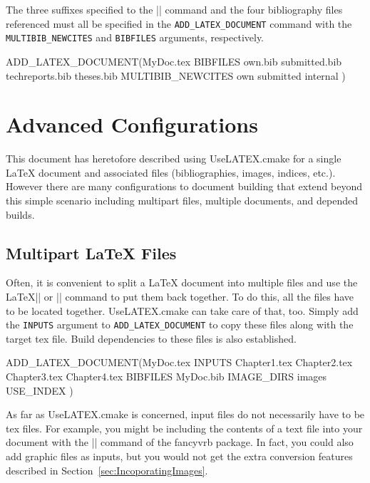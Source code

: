 \documentclass{article}
\newcommand*{\textfile}[1]{\textsf{#1}}
\newcommand*{\textlatexpackage}[1]{\textsf{#1}}
\newcommand*{\textcmake}[1]{\texttt{#1}}
\newcommand*{\UseLATEX}{\textfile{UseLATEX.cmake}\xspace}
\newcommand*{\latex}{\LaTeX\xspace}
\newcommand*{\ald}{\textcmake{ADD\_LATEX\_DOCUMENT}\xspace}
\begin{document}
  The three suffixes specified to the \textlatex|\newcite| command and the
  four bibliography files referenced must all be specified in the \ald
  command with the \textcmake{MULTIBIB\_NEWCITES} and \textcmake{BIBFILES}
  arguments, respectively.

  \begin{CodeListing}
ADD_LATEX_DOCUMENT(MyDoc.tex
  BIBFILES own.bib submitted.bib techreports.bib theses.bib
  MULTIBIB_NEWCITES own submitted internal
  )
  \end{CodeListing}


  \section{Advanced Configurations}
  \label{sec:AdvancedConfigurations}

  This document has heretofore described using \UseLATEX for a single
  \latex document and associated files (bibliographies, images, indices,
  etc.).  However there are many configurations to document building that
  extend beyond this simple scenario including multipart files, multiple
  documents, and depended builds.

  \subsection{Multipart \latex Files}
  \label{sec:MultipartLatexFiles}

  Often, it is convenient to split a \latex document into multiple files
  and use the \latex \textlatex|| or \textlatex|| command to
  put them back together. To do this, all the files have to be located
  together. \UseLATEX can take care of that, too. Simply add the
  \textcmake{INPUTS} argument to \ald to copy these files along with the
  target tex file. Build dependencies to these files is also established.

  \begin{CodeListing}
ADD_LATEX_DOCUMENT(MyDoc.tex
  INPUTS Chapter1.tex Chapter2.tex Chapter3.tex Chapter4.tex
  BIBFILES MyDoc.bib
  IMAGE_DIRS images
  USE_INDEX
  )
  \end{CodeListing}

  As far as \UseLATEX is concerned, input files do not necessarily have to
  be tex files.  For example, you might be including the contents of a text
  file into your document with the \textlatex|\VerbatimInput| command of
  the \textlatexpackage{fancyvrb} package.  In fact, you could also add
  graphic files as inputs, but you would not get the extra conversion
  features described in Section~\ref{sec:IncoporatingImages}.
\end{document}

